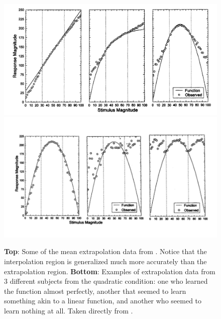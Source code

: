 \documentclass[12pt]{article}
\let\oldtextcite=\textcite
\renewcommand{\textcite}[1]{\textcolor[rgb]{0, .121, .388}{\oldtextcite{#1}}}
\begin{document}
\begin{figure}[H]
    \centering
    \includegraphics[scale=.4]{figures/delosh1997a.png}
    \includegraphics[scale=.5]{figures/delosh1997b.png}
    \caption{\textbf{Top}: Some of the mean extrapolation data from \textcite{delosh1997extrapolation}. Notice that the interpolation region is generalized much more accurately than the extrapolation region. \textbf{Bottom}: Examples of extrapolation data from 3 different subjects from the quadratic condition: one who learned the function almost perfectly, another that seemed to learn something akin to a linear function, and another who seemed to learn nothing at all. Taken directly from \textcite{delosh1997extrapolation}.}
    \label{fig:delosh1997}
\end{figure} 
\end{document}
